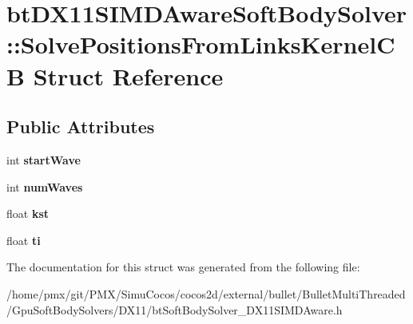 \hypertarget{structbtDX11SIMDAwareSoftBodySolver_1_1SolvePositionsFromLinksKernelCB}{}\section{bt\+D\+X11\+S\+I\+M\+D\+Aware\+Soft\+Body\+Solver\+:\+:Solve\+Positions\+From\+Links\+Kernel\+CB Struct Reference}
\label{structbtDX11SIMDAwareSoftBodySolver_1_1SolvePositionsFromLinksKernelCB}
\subsection*{Public Attributes}
\begin{DoxyCompactItemize}
\item 
\mbox{\label{structbtDX11SIMDAwareSoftBodySolver_1_1SolvePositionsFromLinksKernelCB_a654d6327235e044042f1e35dae898355}} 
int {\bfseries start\+Wave}
\item 
\mbox{\label{structbtDX11SIMDAwareSoftBodySolver_1_1SolvePositionsFromLinksKernelCB_a0fcad28c93856a2c5a8e5dfb55651402}} 
int {\bfseries num\+Waves}
\item 
\mbox{\label{structbtDX11SIMDAwareSoftBodySolver_1_1SolvePositionsFromLinksKernelCB_a6334f81a6199756e806f0ec4f60eb32d}} 
float {\bfseries kst}
\item 
\mbox{\label{structbtDX11SIMDAwareSoftBodySolver_1_1SolvePositionsFromLinksKernelCB_ac9aae7fc709edbd1ac26e3296d8c4ac3}} 
float {\bfseries ti}
\end{DoxyCompactItemize}


The documentation for this struct was generated from the following file\+:\begin{DoxyCompactItemize}
\item 
/home/pmx/git/\+P\+M\+X/\+Simu\+Cocos/cocos2d/external/bullet/\+Bullet\+Multi\+Threaded/\+Gpu\+Soft\+Body\+Solvers/\+D\+X11/bt\+Soft\+Body\+Solver\+\_\+\+D\+X11\+S\+I\+M\+D\+Aware.\+h\end{DoxyCompactItemize}

